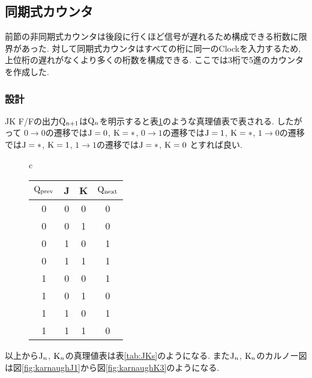 \subsection{同期式カウンタ}
前節の非同期式カウンタは後段に行くほど信号が遅れるため構成できる桁数に限界があった.
対して同期式カウンタはすべての桁に同一のClockを入力するため,上位桁の遅れがなくより多くの桁数を構成できる.
ここでは3桁で5進のカウンタを作成した.
\subsubsection{設計}
JK F/Fの出力${\rm Q}_{n+1}$は${\rm Q}_n$を明示すると表\ref{tab:JKFF_Qn}のような真理値表で表される.
したがって
$0\rightarrow 0$の遷移では$\rm J=0$, $\rm K=\ast$,
$0\rightarrow 1$の遷移では$\rm J=1$, $\rm K=\ast$,
$1\rightarrow 0$の遷移では$\rm J=\ast$, $\rm K=1$,
$1\rightarrow 1$の遷移では$\rm J=\ast$, $\rm K=0$
とすれば良い.
\begin{figure}[h]
  \begin{tabular}{c}
    \begin{minipage}[t]{.48\textwidth}
      \centering
      \begin{tabular}{ccc|c}
        \hline
        ${\rm Q}_{\rm prev}$ & J & K & ${\rm Q}_{\rm next}$\\
        \hline
        0 & 0 & 0 & 0 \\
        0 & 0 & 1 & 0 \\
        0 & 1 & 0 & 1 \\
        0 & 1 & 1 & 1 \\
        1 & 0 & 0 & 1 \\
        1 & 0 & 1 & 0 \\
        1 & 1 & 0 & 1 \\
        1 & 1 & 1 & 0 \\
        \hline
      \end{tabular}
      \label{tab:JKFF_Qn}
    \end{minipage}
    \hfill
    \begin{minipage}[c]{.48\textwidth}
      \centering
    \end{minipage}
  \end{tabular}
\end{figure}
\clearpage
以上から${\rm J}_n$, ${\rm K}_n$の真理値表は表\ref{tab:JKs}のようになる.
また${\rm J}_n$, ${\rm K}_n$のカルノー図は図\ref{fig:karnaughJ1}から図\ref{fig:karnaughK3}のようになる.
